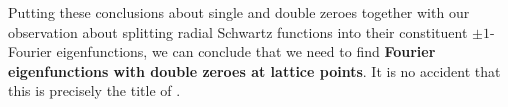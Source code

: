 Putting these conclusions about single and double zeroes together with our observation about splitting radial Schwartz functions into their constituent $\pm 1$-Fourier eigenfunctions, we can conclude that we need to find \textbf{Fourier eigenfunctions with double zeroes at lattice points}. It is no accident that this is precisely the title of \cite[Section 4]{Viazovska8}.


